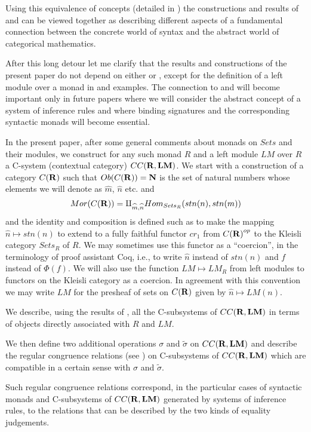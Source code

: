 \documentclass[11pt]{article}
\newcommand{\nn}{{\bf N\rm}}
\newcommand{\rr}{{\bf R}}
\newcommand{\lm}{{\bf LM}}
\newcommand{\wt}{\widetilde}
\newcommand{\wh}{\widehat}
\begin{document}
Using this equivalence of concepts (detailed in \cite{}) the constructions and results of \cite{HM2007} and \cite{FPT} can be viewed together as describing different aspects of a fundamental connection between the concrete world of syntax and the abstract world of categorical mathematics. 

After this long detour let me clarify that the results and constructions of the present paper do not depend on either \cite{HM2007} or \cite{FPT}, except for the definition of a left module over a monad in \cite{HM2007} and examples. The connection to \cite{HM2007} and \cite{FPT} will become important only in future papers where we will consider the abstract concept of a system of inference rules and where binding signatures and the corresponding syntactic monads will become essential. 

In the present paper, after some general comments about monads on $Sets$ and their modules, we construct for any such monad $R$ and a left module $LM$ over $R$ a C-system (contextual category) $CC(\rr,\lm)$.  We start with a construction of a category ${C(\rr)}$ such that $Ob({C(\rr)})=\nn$ is the set of natural numbers whose elements we will denote as $\wh{m}$, $\wh{n}$ etc. and
%
$$Mor({C(\rr)})=\amalg_{\wh{m},\wh{n}}Hom_{Sets_R}(stn(n),stn(m))$$
%
and the identity and composition is defined such as to make the mapping $\wh{n}\mapsto stn(n)$ to extend to a fully faithful functor $cr_1$ from ${C(\rr)}^{op}$ to the Kleisli category $Sets_R$ of $R$.  We may sometimes  use this functor as a ``coercion'', in the terminology of proof assistant Coq, i.e., to write $\wh{n}$ instead of $stn(n)$ and $f$ instead of $\Phi(f)$. We will also use the function $LM\mapsto LM_R$ from left modules to functors on the Kleisli category as a coercion. In agreement with this convention we may write $LM$ for the presheaf of sets on ${C(\rr)}$ given by $\wh{n}\mapsto LM(n)$.  

We describe, using the results of \cite{Csubsystems}, all the C-subsystems of $CC(\rr,\lm)$ in terms of objects directly associated with $R$ and $LM$. 

We then define two additional operations $\sigma$ and $\wt{\sigma}$ on $CC(\rr,\lm)$ and describe the regular congruence relations (see \cite{Csubsystems}) on C-subsystems of $CC(\rr,\lm)$ which are compatible in a certain sense with $\sigma$ and $\wt{\sigma}$.

Such regular congruence relations correspond, in the particular cases of syntactic monads and C-subsystems of $CC(\rr,\lm)$ generated by systems of inference rules, to the relations that can be described by the two kinds of equality judgements. 
\end{document}
